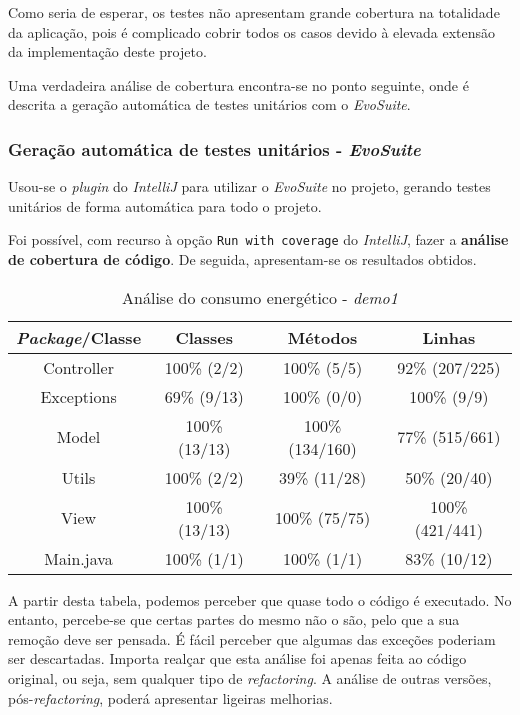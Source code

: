 \documentclass[a4paper]{report}
\begin{document}
Como seria de esperar, os testes não apresentam grande cobertura na totalidade da aplicação, pois é complicado cobrir todos os casos devido à elevada extensão da implementação deste projeto. 

Uma verdadeira análise de cobertura encontra-se no ponto seguinte, onde é descrita a geração automática de testes unitários com o \textit{EvoSuite}.

\subsubsection{Geração automática de testes unitários - \textit{EvoSuite}}
Usou-se o \textit{plugin} do \textit{IntelliJ} para utilizar o \textit{EvoSuite} no projeto, gerando testes unitários de forma automática para todo o projeto.


Foi possível, com recurso à opção \texttt{Run with coverage} do \textit{IntelliJ}, fazer a \textbf{análise de cobertura de código}.
De seguida, apresentam-se os resultados obtidos.

\begin{table}[h] 
    \caption{Análise do consumo energético - \textit{demo1}}
    \begin{center}
        \begin{tabular}{ || c | c | c | c || }
        \hline
        \textbf{\textit{Package}/Classe} & \textbf{Classes} & \textbf{Métodos} & \textbf{Linhas} \\
        \hline
        \hline
        Controller & 100\% (2/2) & 100\% (5/5) & 92\% (207/225) \\
        \hline
        Exceptions & 69\% (9/13) & 100\% (0/0) & 100\% (9/9) \\
        \hline
        Model & 100\% (13/13) & 100\% (134/160) & 77\% (515/661) \\
        \hline
        Utils & 100\% (2/2) & 39\% (11/28) & 50\% (20/40) \\
        \hline
        View & 100\% (13/13) & 100\% (75/75) & 100\% (421/441) \\
        \hline
        Main.java & 100\% (1/1) & 100\% (1/1) & 83\% (10/12) \\
        \hline
        \end{tabular} 
    \end{center}
\end{table}

A partir desta tabela, podemos perceber que quase todo o código é executado. No entanto, percebe-se que certas partes do mesmo não o são, pelo que a sua remoção deve ser pensada.
É fácil perceber que algumas das exceções poderiam ser descartadas. Importa realçar que esta análise foi apenas feita ao código original, ou seja, sem qualquer tipo de \textit{refactoring}. 
A análise de outras versões, pós-\textit{refactoring}, poderá apresentar ligeiras melhorias.
\end{document}
